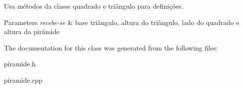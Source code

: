 Usa métodos da classe quadrado e triângulo para definições. 


\begin{DoxyParams}{Parameters}
{\em recebe-\/se} & base triângulo, altura do triângulo, lado do quadrado e altura da pirâmide \\
\hline
\end{DoxyParams}


The documentation for this class was generated from the following files\+:\begin{DoxyCompactItemize}
\item 
piramide.\+h\item 
piramide.\+cpp\end{DoxyCompactItemize}
